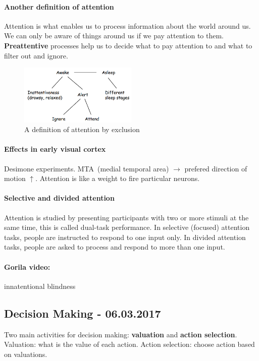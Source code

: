 \documentclass[12pt,article,oneside,a4paper]{memoir}
\begin{document}
\paragraph{Another definition of attention}
Attention is what enables us to process information about the world around us.
We can only be aware of things around us if we pay attention to them.
\textbf{Preattentive} processes help us to decide what to pay attention to and
what to filter out and ignore.

\begin{figure}[h]
  \centering
  \includegraphics[width=0.5\textwidth]{imgs/attention.png}
  \caption{A definition of attention by exclusion}
  \label{fig:attention}
\end{figure}

\paragraph{Effects in early visual cortex}
Desimone experiments. MTA~(medial temporal area) $\rightarrow$ prefered
direction of motion $\uparrow$. Attention is like a weight to fire particular
neurons.

\paragraph{Selective and divided attention}
Attention is studied by presenting participants with two or more stimuli at the
same time, this is called dual-task performance. In selective (focused)
attention tasks, people are instructed to respond to one input only. In divided
attention tasks, people are asked to process and respond to more than one input.

\paragraph{Gorila video:} innatentional blindness

\newpage
\subsection{Decision Making - 06.03.2017}
Two main activities for decision making: \textbf{valuation} and \textbf{action
selection}.
Valuation: what is the value of each action. Action selection: choose action
based on valuations.
\end{document}
